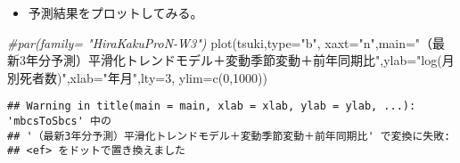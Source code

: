 \documentclass[]{article}
\newenvironment{Shaded}{\begin{snugshade}}{\end{snugshade}}
\newcommand{\AttributeTok}[1]{\textcolor[rgb]{0.77,0.63,0.00}{#1}}
\newcommand{\CommentTok}[1]{\textcolor[rgb]{0.56,0.35,0.01}{\textit{#1}}}
\newcommand{\ConstantTok}[1]{\textcolor[rgb]{0.00,0.00,0.00}{#1}}
\newcommand{\DecValTok}[1]{\textcolor[rgb]{0.00,0.00,0.81}{#1}}
\newcommand{\FloatTok}[1]{\textcolor[rgb]{0.00,0.00,0.81}{#1}}
\newcommand{\FunctionTok}[1]{\textcolor[rgb]{0.00,0.00,0.00}{#1}}
\newcommand{\NormalTok}[1]{#1}
\newcommand{\OtherTok}[1]{\textcolor[rgb]{0.56,0.35,0.01}{#1}}
\newcommand{\SpecialCharTok}[1]{\textcolor[rgb]{0.00,0.00,0.00}{#1}}
\newcommand{\StringTok}[1]{\textcolor[rgb]{0.31,0.60,0.02}{#1}}
\providecommand{\tightlist}{%
  \setlength{\itemsep}{0pt}\setlength{\parskip}{0pt}}
\begin{document}
\begin{Shaded}
\end{Shaded}

\begin{itemize}
\tightlist
\item
  予測結果をプロットしてみる。
\end{itemize}

\begin{Shaded}
\begin{Highlighting}[]
\CommentTok{\#par(family= "HiraKakuProN{-}W3")}
\FunctionTok{plot}\NormalTok{(tsuki,}\AttributeTok{type=}\StringTok{"b"}\NormalTok{, }\AttributeTok{xaxt=}\StringTok{"n"}\NormalTok{,}\AttributeTok{main=}\StringTok{"（最新3年分予測）平滑化トレンドモデル＋変動季節変動＋前年同期比"}\NormalTok{,}\AttributeTok{ylab=}\StringTok{"log(月別死者数)"}\NormalTok{,}\AttributeTok{xlab=}\StringTok{"年月"}\NormalTok{,}\AttributeTok{lty=}\DecValTok{3}\NormalTok{, }\AttributeTok{ylim=}\FunctionTok{c}\NormalTok{(}\DecValTok{0}\NormalTok{,}\DecValTok{1000}\NormalTok{))}
\end{Highlighting}
\end{Shaded}

\begin{verbatim}
## Warning in title(main = main, xlab = xlab, ylab = ylab, ...): 'mbcsToSbcs' 中の
## '（最新3年分予測）平滑化トレンドモデル＋変動季節変動＋前年同期比' で変換に失敗:
## <ef> をドットで置き換えました
\end{verbatim}
\end{document}
